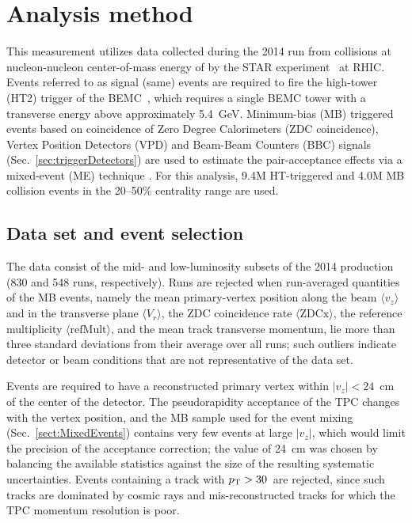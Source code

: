 \section{Analysis method} \label{sect:Method}
This measurement utilizes data collected during the 2014 run from \AuAu collisions at nucleon-nucleon center-of-mass energy of  by the STAR experiment~\cite{ACKERMANN2003624} at RHIC.  Events referred to as signal (same) events are required to fire the high-tower (HT2) trigger of the BEMC~\cite{BEDDO2003725}, which requires a single BEMC tower with a transverse energy above approximately 5.4~GeV.  Minimum-bias (MB) triggered events based on coincidence of Zero Degree Calorimeters (ZDC coincidence), Vertex Position Detectors (VPD) and Beam-Beam Counters (BBC) signals (Sec.~\ref{sec:triggerDetectors}) are used to estimate the pair-acceptance effects via a mixed-event (ME) technique \cite{PhysRevC.96.024905}. For this analysis, 9.4M HT-triggered and 4.0M MB collision events in the 20--50\% centrality range are used.

\subsection{Data set and event selection} \label{sec:JHEventSel}
The data consist of the mid- and low-luminosity subsets of the 2014 \AuAu production (830 and 548 runs, respectively).
%
Runs are rejected when run-averaged quantities of the MB events, namely the mean primary-vertex position along the beam $\langle v_z \rangle$ and in the transverse plane $\langle V_r \rangle$, the ZDC coincidence rate $\langle \mathrm{ZDCx} \rangle$, the reference multiplicity $\langle \mathrm{refMult} \rangle$, and the mean track transverse momentum, lie more than three standard deviations from their average over all runs; such outliers indicate detector or beam conditions that are not representative of the data set.

Events are required to have a reconstructed primary vertex within $|v_{z}| < 24$~cm of the center of the detector.
%
The pseudorapidity acceptance of the TPC changes with the vertex position, and the MB sample used for the event mixing (Sec.~\ref{sect:MixedEvents}) contains very few events at large $|v_z|$, which would limit the precision of the acceptance correction; the value of 24~cm was chosen by balancing the available statistics against the size of the resulting systematic uncertainties.
%
Events containing a track with $\ensuremath{p_{\rm T}}\xspace > 30$~\GeVc are rejected, since such tracks are dominated by cosmic rays and mis-reconstructed tracks for which the TPC momentum resolution is poor.

